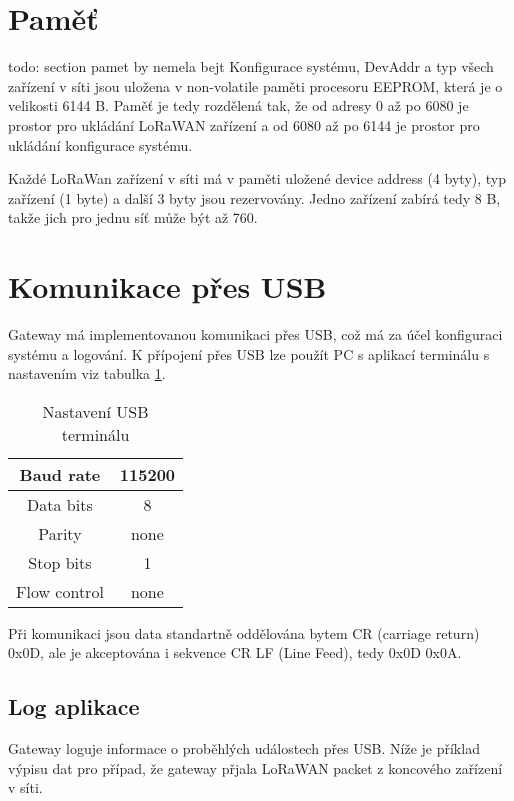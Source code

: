 \section{Paměť}
todo: section pamet by nemela bejt
Konfigurace systému, DevAddr a typ všech zařízení v síti jsou uložena v non-volatile paměti procesoru EEPROM, která je o velikosti 6144 B. 
Paměť je tedy rozdělená tak, že od adresy 0 až po 6080 je prostor pro ukládání LoRaWAN zařízení a od 6080 až po 6144 je prostor pro ukládání konfigurace systému.

Každé LoRaWan zařízení v síti má v paměti uložené device address (4 byty), typ zařízení (1 byte) a další 3 byty jsou rezervovány. 
Jedno zařízení zabírá tedy 8 B, takže jich pro jednu síť může být až 760.


\section{Komunikace přes USB}
Gateway má implementovanou komunikaci přes USB, což má za účel konfiguraci systému a logování. K přípojení přes USB lze použít PC s  aplikací terminálu s nastavením viz tabulka \ref{table:usb_term}.

\begin{table}[!h]
    \centering
    \begin{tabular}{ |c|c| }
     \hline

     Baud rate              & 115200           \\ \hline
     Data bits              & 8                 \\ \hline
     Parity                 & none              \\ \hline
     Stop bits              & 1                 \\ \hline
     Flow control           & none               \\ \hline

    \end{tabular}
    \caption{Nastavení USB terminálu}
    \label{table:usb_term}
\end{table}

Při komunikaci jsou data standartně oddělována bytem CR (carriage return) 0x0D, ale je akceptována i sekvence CR LF (Line Feed), tedy 0x0D 0x0A. 

\subsection{Log aplikace}
Gateway loguje informace o proběhlých událostech přes USB. 
Níže je příklad výpisu dat pro případ, že gateway přjala LoRaWAN packet z koncového zařízení v síti.

